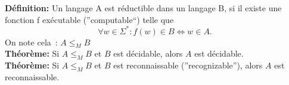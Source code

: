 \documentclass[a4paper,12pt]{article}
\begin{document}
  \textbf{Définition:} Un langage A est réductible dans un langage B, si il existe une fonction f exécutable (''computable``) telle que
  $$\forall w \in \Sigma^* : f(w) \in B \Leftrightarrow w \in A.$$
  On note cela~: $A \leq_M B$\\

  \textbf{Théorème:} Si $A \leq_M B$ et $B$ est décidable, alors $A$ est décidable.\\

  \textbf{Théorème:} Si $A \leq_M B$ et $B$ est reconnaissable (''recognizable''), alors $A$ est reconnaissable.
\end{document}
